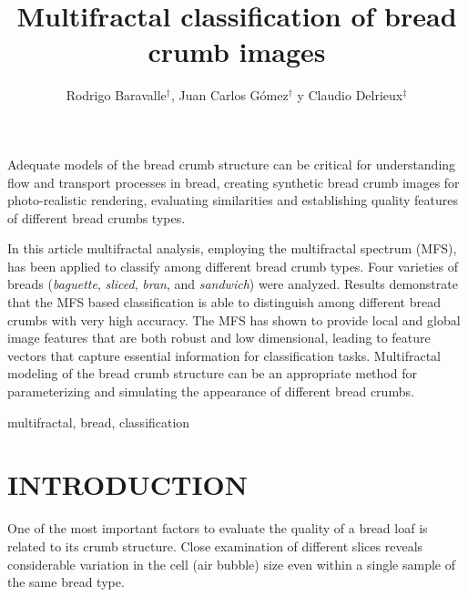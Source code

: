 \documentclass[a4paper,10pt]{article}
\affiliation{
\dag Laboratorio de Sistemas Din\'amicos y Procesamiento de Informaci\'on \\
     FCEIA, Universidad Nacional de Rosario, - CIFASIS - CONICET \\
     \{baravalle,gomez\}@cifasis-conicet.gov.ar \\
\ddag DIEC, Universidad Nacional del Sur - IIIE-CONICET \\
    {\ cad@uns.edu.ar}
}
\begin{document}
\title{Multifractal classification of bread crumb images}
\author{Rodrigo Baravalle$^{\dag }$, Juan Carlos G\'omez$^{\dag }$ y Claudio Delrieux$^{\ddag }$}
\maketitle


\balance

\abstract
Adequate models of the bread crumb structure can be critical for understanding flow and transport
processes in bread, creating synthetic bread crumb images for photo-realistic rendering, evaluating similarities and establishing quality features of different bread crumbs types.

In this article multifractal analysis, employing the multifractal spectrum (MFS), has been applied to classify among different bread crumb types. Four varieties of breads ({\em baguette}, {\em sliced}, {\em bran}, and {\em sandwich}) were analyzed. Results demonstrate that the MFS based classification is able to distinguish among different bread crumbs with very high accuracy. The MFS has shown to provide local and global image features that are both robust and low dimensional, leading to feature vectors that capture essential information for classification tasks. Multifractal modeling of the bread crumb structure can be an appropriate method for parameterizing and simulating the appearance of different bread crumbs.
\endabstract

\keywords
multifractal, bread, classification
\endpalabras

\section{INTRODUCTION}
One of the most important factors to evaluate the quality of a bread loaf is related to its crumb structure. Close examination of different slices reveals considerable variation in the cell (air bubble) size even within a single sample of the same bread type. 
\end{document}
